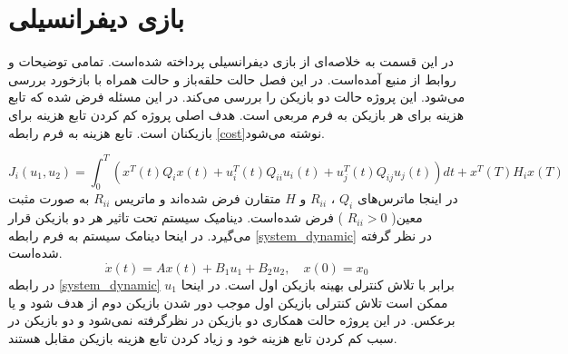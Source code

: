 \chapter{بازی دیفرانسیلی}
در این قسمت به خلاصه‌ای از بازی دیفرانسیلی پرداخته شده‌است. تمامی توضیحات و روابط  از منبع 
 \cite{article1}
 آمده‌است. در این فصل حالت حلقه‌باز و حالت همراه با بازخورد بررسی می‌شود.
 این پروژه حالت دو بازیکن را بررسی می‌کند. در این مسئله فرض شده  که تابع هزینه برای هر بازیکن به فرم مربعی است. 	هدف اصلی پروژه کم کردن تابع هزینه برای بازیکنان است. تابع هزینه به فرم رابطه \ref{cost}نوشته می‌شود.

 \begin{equation}\label{cost}
 	J_i(u_1, u_2) = \int_{0}^{T}\left( x ^T(t) Q_i x(t)+
 	 u_i ^T(t) Q_{ii} u_i(t)+
 	 u_j ^T(t) Q_{ij} u_j(t)
 	\right)dt+
 	 x ^T(T) H_i x(T) 
  \end{equation}
در اینجا ماترس‌های 
$Q_i$ ، $R_{ii}$
و
$H$
متقارن فرض شده‌اند و ماتریس 
$R_{ii}$
به صورت مثبت معین(
$R_{ii}>0$
)
فرض شده‌است.
دینامیک سیستم تحت تاثیر هر دو بازیکن قرار می‌گیرد. در اینحا دینامک سیستم به فرم رابطه \ref{system_dynamic} در نظر گرفته شده‌است.
\begin{equation}\label{system_dynamic}
	\dot x(t) = Ax(t) + B_1u_1 + B_2u_2, \quad x(0) = x_0
\end{equation}
در رابطه 
\ref{system_dynamic}
$u_1$
برابر با تلاش کنترلی بهینه بازیکن اول است. در اینحا ممکن است تلاش کنترلی بازیکن اول موجب دور شدن بازیکن دوم از هدف شود و یا برعکس. در این پروژه حالت همکاری دو بازیکن در نظرگرفته نمی‌شود و دو بازیکن در سبب کم کردن تابع هزینه خود و زیاد کردن تابع هزینه بازیکن مقابل هستند.
